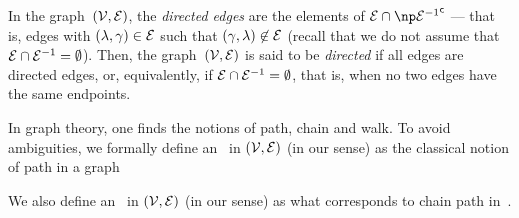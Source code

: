 \documentclass[12pt]{article}
\def\citep#1{\cite{#1}}
\begin{document}
In the graph~$({\cal V},{\cal E})$, 
the \emph{directed edges} are the elements of
$\EDGE \cap \npComplementary{ \Converse{\EDGE} }$ --- that is, 
edges with $(\lambda,\gamma)\in {\cal E}$ such that $(\gamma, \lambda)\not\in {\cal E}$
(recall that we do not assume that ${\cal E} \cap {\cal E}^{-1}=\emptyset$).
Then, the graph~$({\cal V},{\cal E})$ is said to be \emph{directed} if
all edges are directed edges, 
or, equivalently, if 
\( {\cal E} \cap {\cal E}^{-1}=\emptyset \), that is, 
when no two edges have the same endpoints.

In graph theory, one finds the notions of path, chain and walk. 
To avoid ambiguities,
we formally define an \EdgePath\ in $({\cal V},{\cal E})$ (in our sense) 
as the classical notion of path in a graph~\citep{Diestel}

We also define an \undirectedEdgePath\ in $({\cal V},{\cal E})$ (in our sense)
as what corresponds to chain path in~\citep{Lauritzen-et-al-1990}. 
\medskip
\end{document}

